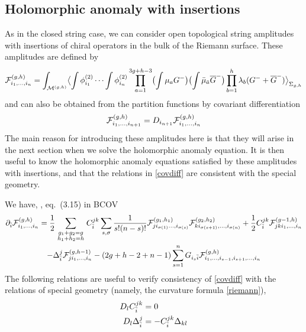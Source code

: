 \subsection{Holomorphic anomaly with insertions}
\label{insertions}

As in the closed string case, we can consider open topological string
amplitudes with insertions of chiral operators in the bulk of the
Riemann surface. These amplitudes are defined by
\begin{equation}
\eqlabel{openins}
\F gh_{i_1,\ldots,i_n} = \int_{\calm gh} \bigl\langle 
\int \phi_{i_1}^{(2)} \cdots \int \phi_{i_n}^{(2)}
\prod_{a=1}^{3g+h-3} 
\bigl(\int \mu_a G^-\bigr)\bigl(\int \mub_\ab \Gb^-\bigr) 
\prod_{b=1}^{h} \lambda_b(G^-+\Gb^-)\bigr\rangle_{\Sigma_{g,h}}
\end{equation}
and can also be obtained from the partition functions by covariant
differentiation
\begin{equation}
\eqlabel{covdiff}
\F gh_{i_1,\ldots,i_{n+1}} = D_{i_{n+1}}\F gh_{i_1,\ldots,i_n}
\end{equation}
The main reason for introducing these amplitudes here is that
they will arise in the next section when we solve the holomorphic
anomaly equation. It is then useful to know the holomorphic
anomaly equations satisfied by these amplitudes with insertions, 
and that the relations in \eqref{covdiff} are consistent with the 
special geometry.

We have, \cf, eq.\ (3.15) in BCOV
\begin{multline}
\eqlabel{inshan}
\del_\ib \F gh_{i_1,\ldots,i_n} = 
\frac 12 \sum_{\topa{g_1+g_2=g}{h_1+h_2=h}} C_{\ib}^{jk}
\sum_{s,\sigma} \frac{1}{s!(n-s)!}
\F {g_1}{h_1}_{ji_{\sigma(1)}\ldots,i_{\sigma(s)}} 
\F {g_2}{h_2}_{ki_{\sigma(s+1)},\ldots,i_{\sigma(n)}} +
\frac 12 C_{\ib}^{jk} \F {g-1}h_{jki_1,\ldots,i_n} \\ -
\Delta_{\ib}^j \F g{h-1}_{ji_1,\ldots,i_n}
-(2g+h-2+n-1)\sum_{s=1}^n G_{i_s\ib}
\F gh_{i_1,\ldots,i_{s-1},i_{s+1},\ldots,i_n}
\end{multline}
The following relations are useful to verify consistency of \eqref{covdiff} 
with the relations of special geometry (namely, the curvature formula 
\eqref{riemann}),
\begin{equation}
\eqlabel{useful}
\begin{split}
D_l C_\ib^{jk} &=0\\
D_l\Delta_\ib^j &= - C_\ib^{jk}\Delta_{kl}
\end{split}
\end{equation}

